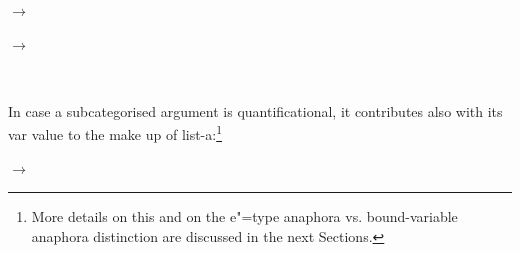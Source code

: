 \documentclass[output=paper
,modfonts
,nonflat]{langsci/langscibook}
\begin{document}
 \begin{samepage}
\begin{exe}
\ex\label{lexconst}
\end{exe}

\avmfont{\sc}
\avmvalfont{\it}
\begin{avm}
\hfill
{}
\end{avm}
\begin{flushright}
$\longrightarrow$
\begin{avm}
\hfill
{}
\end{avm}
\end{flushright}

\begin{avm}
\hfill
{}
\end{avm}
\begin{flushright}
$\longrightarrow$
\begin{avm}
\hfill
{}
\end{avm}
\avmoptions{}
\\

\end{flushright}
\end{samepage}

In case a subcategorised argument is quantificational, 
it contributes also with its {\sc var} value to the make up of
{\sc list-a}:\footnote{
More details on this and on the
e"=type anaphora vs. bound-variable anaphora distinction are discussed
in the next Sections.}

\begin{exe}
\ex\label{lexconst2}
\end{exe}

\avmfont{\sc}
\avmvalfont{\it}
\begin{avm}
\hfill
{}
\end{avm}
\begin{flushright}
$\longrightarrow$
\begin{avm}
\end{avm}
\end{flushright}
\avmoptions{}
\end{document}
